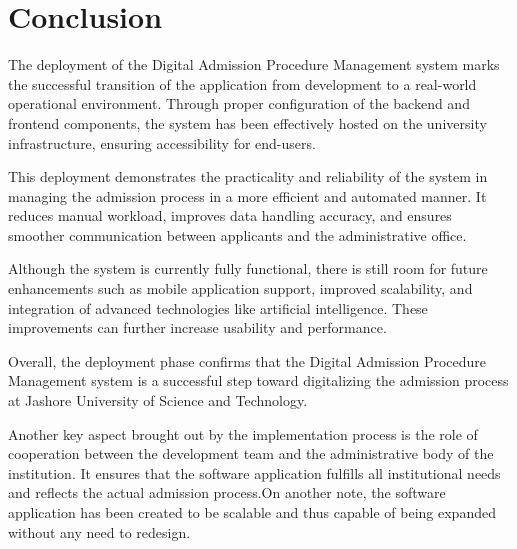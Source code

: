 
\chapter{Conclusion}


\noindent The deployment of the Digital Admission Procedure Management system marks the successful transition of the application from development to a real-world operational environment. Through proper configuration of the backend and frontend components, the system has been effectively hosted on the university infrastructure, ensuring accessibility for end-users.

\vspace{0.3cm}

\noindent This deployment demonstrates the practicality and reliability of the system in managing the admission process in a more efficient and automated manner. It reduces manual workload, improves data handling accuracy, and ensures smoother communication between applicants and the administrative office.

\vspace{0.3cm}

\noindent Although the system is currently fully functional, there is still room for future enhancements such as mobile application support, improved scalability, and integration of advanced technologies like artificial intelligence. These improvements can further increase usability and performance.

\vspace{0.3cm}

\noindent Overall, the deployment phase confirms that the Digital Admission Procedure Management system is a successful step toward digitalizing the admission process at Jashore University of Science and Technology.

\vspace{0.3cm}

\noindent
Another key aspect brought out by the implementation process is the role of cooperation between the development team and the administrative body of the institution. It ensures that the software application fulfills all institutional needs and reflects the actual admission process.On another note, the software application has been created to be scalable and thus capable of being expanded without any need to redesign.